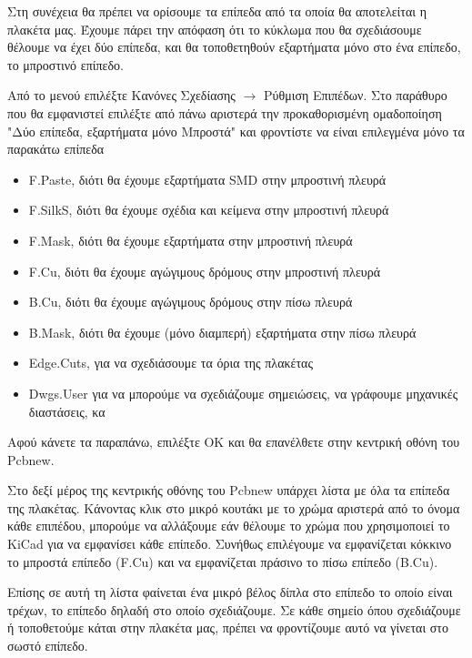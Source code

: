 \documentclass[a4paper]{article}
\begin{document}
Στη συνέχεια θα πρέπει να ορίσουμε τα επίπεδα από τα οποία θα αποτελείται η πλακέτα μας. Έχουμε πάρει την απόφαση ότι το κύκλωμα που θα σχεδιάσουμε θέλουμε να έχει δύο επίπεδα, και θα τοποθετηθούν εξαρτήματα μόνο στο ένα επίπεδο, το μπροστινό επίπεδο. 

Από το μενού επιλέξτε Κανόνες Σχεδίασης $\rightarrow$ Ρύθμιση Επιπέδων. Στο παράθυρο που θα εμφανιστεί επιλέξτε από πάνω αριστερά την προκαθορισμένη ομαδοποίηση "Δύο επίπεδα, εξαρτήματα μόνο Μπροστά" και φροντίστε να είναι επιλεγμένα μόνο τα παρακάτω επίπεδα
\begin{itemize}
    \item F.Paste, διότι θα έχουμε εξαρτήματα SMD στην μπροστινή πλευρά
    \item F.SilkS, διότι θα έχουμε σχέδια και κείμενα στην μπροστινή πλευρά
    \item F.Mask, διότι θα έχουμε εξαρτήματα στην μπροστινή πλευρά
    \item F.Cu, διότι θα έχουμε αγώγιμους δρόμους στην μπροστινή πλευρά
    \item B.Cu, διότι θα έχουμε αγώγιμους δρόμους στην πίσω πλευρά
    \item B.Mask, διότι θα έχουμε (μόνο διαμπερή) εξαρτήματα στην πίσω πλευρά
    \item Edge.Cuts, για να σχεδιάσουμε τα όρια της πλακέτας
    \item Dwgs.User για να μπορούμε να σχεδιάζουμε σημειώσεις, να γράφουμε μηχανικές διαστάσεις, κα
\end{itemize}

Αφού κάνετε τα παραπάνω, επιλέξτε ΟΚ και θα επανέλθετε στην κεντρική οθόνη του \textenglish{Pcbnew}.

\begin{figure}
  \begin{center}
    \label{fig:kicad-main}
  \end{center}
\end{figure}

Στο δεξί μέρος της κεντρικής οθόνης του \textenglish{Pcbnew} υπάρχει λίστα με όλα τα επίπεδα της πλακέτας. Κάνοντας κλικ στο μικρό κουτάκι με το χρώμα αριστερά από το όνομα κάθε επιπέδου, μπορούμε να αλλάξουμε εάν θέλουμε το χρώμα που χρησιμοποιεί το \textenglish{KiCad} για να εμφανίσει κάθε επίπεδο. Συνήθως επιλέγουμε να εμφανίζεται κόκκινο το μπροστά επίπεδο (F.Cu) και να εμφανίζεται πράσινο το πίσω επίπεδο (B.Cu).

Επίσης σε αυτή τη λίστα φαίνεται ένα μικρό βέλος δίπλα στο επίπεδο το οποίο είναι τρέχων, το επίπεδο δηλαδή στο οποίο σχεδιάζουμε. Σε κάθε σημείο όπου σχεδιάζουμε ή τοποθετούμε κάται στην πλακέτα μας, πρέπει να φροντίζουμε αυτό να γίνεται στο σωστό επίπεδο.
\end{document}
